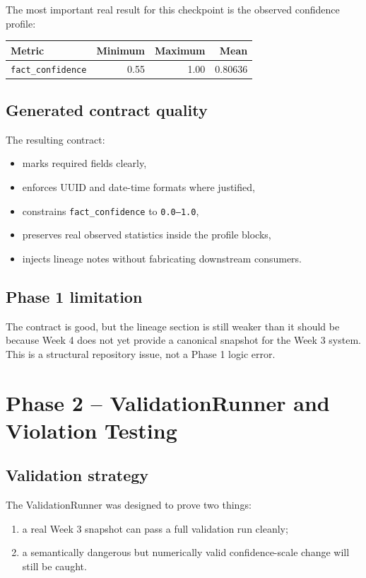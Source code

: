 \documentclass[11pt]{report}
\begin{document}
The most important real result for this checkpoint is the observed confidence profile:

\begin{center}
\begin{tabular}{lrrr}
\toprule
Metric & Minimum & Maximum & Mean \\
\midrule
\texttt{fact\_confidence} & 0.55 & 1.00 & 0.80636 \\
\bottomrule
\end{tabular}
\end{center}

\section{Generated contract quality}
The resulting contract:
\begin{itemize}[leftmargin=1.5em]
  \item marks required fields clearly,
  \item enforces UUID and date-time formats where justified,
  \item constrains \texttt{fact\_confidence} to \texttt{0.0--1.0},
  \item preserves real observed statistics inside the profile blocks,
  \item injects lineage notes without fabricating downstream consumers.
\end{itemize}

\section{Phase 1 limitation}
The contract is good, but the lineage section is still weaker than it should be because Week 4 does not yet provide a canonical snapshot for the Week 3 system. This is a structural repository issue, not a Phase 1 logic error.

\clearpage
\chapter{Phase 2 -- ValidationRunner and Violation Testing}

\section{Validation strategy}
The ValidationRunner was designed to prove two things:

\begin{enumerate}[leftmargin=1.6em]
  \item a real Week 3 snapshot can pass a full validation run cleanly;
  \item a semantically dangerous but numerically valid confidence-scale change will still be caught.
\end{enumerate}
\end{document}

